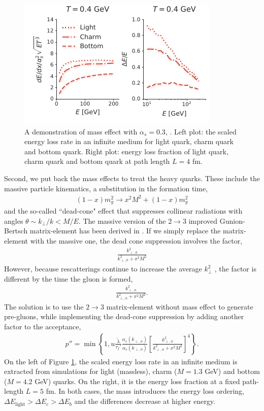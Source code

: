 \documentclass[aps, prc, reprint, amsmath, groupedaddress, nofootinbib]{revtex4-1}
\begin{document}
{\begin{figure}
\includegraphics[width=\columnwidth]{Eloss_mass.pdf}
\caption{A demonstration of mass effect with $\alpha_s=0.3$, . Left plot: the scaled energy loss rate in an infinite medium for light quark, charm quark and bottom quark. Right plot: energy loss fraction of light quark, charm quark and bottom quark at path length $L=4$ fm.  }
\label{fig:mass}
\end{figure}

Second, we put back the mass effects to treat the heavy quarks. These include the massive particle kinematics, a substitution in the formation time,
\begin{eqnarray}
(1-x)m_g^2 \rightarrow x^2M^2 + (1-x)m_g^2
\end{eqnarray}
and the so-called ``dead-cone" effect that suppresses collinear radiations with angles $\theta \sim k_\perp/k < M/E$. 
The massive version of the $2\rightarrow3$ improved Gunion-Bertsch matrix-element has been derived in \cite{Uphoff:2014hza}.
If we simply replace the matrix-element with the massive one, the dead cone suppression involves the factor,
\begin{eqnarray}
\frac{k_{\perp,0}^2}{k_{\perp,0}^2+x^2M^2}
\end{eqnarray}
However, because rescatterings continue to increase the average $k_{\perp}^2$ , the factor is different by the time the gluon is formed,
\begin{eqnarray}
\frac{k_{\perp,n}^2}{k_{\perp,n}^2+x^2M^2}.
\end{eqnarray}
The solution is to use the $2\rightarrow3$ matrix-element without mass effect to generate pre-gluons, while implementing the dead-cone suppression by adding another factor to the acceptance,
\begin{eqnarray}
p'' = \min\left\{1, u\frac{\tilde{\lambda}}{\tau_f'}\frac{\alpha_s(k_{\perp,n})}{\alpha_s(k_{\perp,0})} \left[\frac{k_{\perp,n}^2}{k_{\perp,n}^2+x^2 M^2}\right]^4\right\}.
\end{eqnarray}
On the left of Figure \ref{fig:mass}, the scaled energy loss rate in an infinite medium is extracted from simulations for light (massless), charm ($M=1.3$ GeV) and bottom ($M=4.2$ GeV) quarks. 
On the right, it is the energy loss fraction at a fixed path-length $L=5$ fm.
In both cases, the mass introduces the energy loss ordering, $\Delta E_{\textrm{light}} > \Delta E_c > \Delta E_b$ and the differences decrease at higher energy.

}
\end{document}
